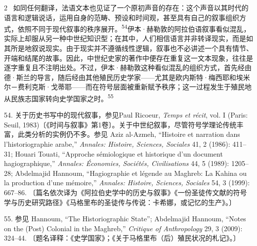 \documentclass[10pt,a4paper]{article}
\begin{document}
\begin{paracol}{2}
\switchcolumn*
{\scriptsize\color{gray} [p. 12]}\ 如同任何翻译，法语文本也见证了一个原初声音的存在：这个声音以其时代的语言和逻辑说话，运用自身的范畴、预设和时间观，甚至具有自己的叙事组织方式，依照不同于现代叙事的秩序展\mbox{开。\textsuperscript{54}}伊本·赫勒敦的阿拉伯语叙事看似混乱，实际上却服从另一种中世纪知识型；在其中，人们相信语言并非转译现实，而是如其所是地叙说现实。由于现实并不遵循线性逻辑，叙事也不必讲述一个具有情节、开端和结尾的故事。因此，中世纪史家的著作中便存在重复这一文本现象，往往是逐字重复且不注明出处。不过，伊本·赫勒敦这种看似混乱的组织方式，首先经由德·斯兰的导言，随后经由其他殖民历史学家——尤其是欧内斯特·梅西耶和埃米尔－费利克斯·戈蒂耶——而在符号层面被重新赋予秩序；这一过程发生于殖民地从民族志国家转向史学国家之\mbox{时。\textsuperscript{55}}\par{\small 54. 关于历史书写中的现代叙事，参见Paul Ricoeur, \textit{Temps et récit}, vol. I (Paris: Seuil, 1983)〔《时间与叙事》第1卷〕。关于中世纪叙事，尽管符号学理论传统丰富，此类分析的实例仍不多。参见 Aziz al-Azmeh, “Histoire et narration dans l’historiographie arabe,” \textit{Annales: Histoire, Sciences, Sociales} 41, 2 (1986): 411–31; Houari Touati, “Approche sémiologique et historique d’un document hagiographique,” \textit{Annales: Économies, Sociétés, Civilisations} 44, 5 (1989): 1205–28; Abdelmajid Hannoum, “Hagiographie et légende au Maghreb: La Kahina ou la production d’une mémoire,” \textit{Annales: Histoire, Sciences, Sociales} 54, 3 (1999): 667–86. 〔篇名依次译为《阿拉伯史学中的历史与叙事》《一份圣徒传文献的符号学与历史研究路径》《马格里布的圣徒传与传说：卡希娜，或记忆的生产》。〕\par}{\small 55. 参见 Hannoum, “The Historiographic State”; Abdelmajid Hannoum, “Notes on the (Post) Colonial in the Maghreb,” \textit{Critique of Anthropology} 29, 3 (2009): 324–44. 〔题名译释：《史学国家》；《关于马格里布（后）殖民状况的札记》。〕\par}
\switchcolumn

\end{paracol}
\end{document}

